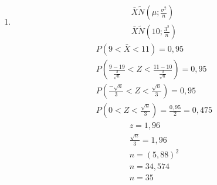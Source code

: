 \begin{description}
\begin{enumerate}[label=(\alph*)]
$n=25$
    \begin{align*}
      \mathbf{X} = \left(X_1, X_2, \ldots, $X_{25}\right) \\
      \bar{X} \tilde N(\mu; \frac{\sigma^2}{n})\\
      \bar{X} \tilde N(10; \frac{3^2}{25})
    \end{align*}
    \begin{align*}
      P(a< \bar{X}<11) = P \left(\frac{9-10}{\frac{3}{\sqrt{25}}} < Z < \frac{11-10}{\frac{3}{\sqrt{25}}}\right) \\
      P(- \frac{5}{3} < Z < \frac{5}{3}) = P \left(-1,67 < Z < 1,67\right) \\
=2 P( 0< Z <1,67 ) \\
=2 \times 0,45254 = 0,9105
    \end{align*}
  \item 
    \begin{align*}
      \bar{X} \tilde N(\mu; \frac{\sigma^2}{n})\\
      \bar{X} \tilde N(10; \frac{3^2}{n})
    \end{align*}
\begin{align*}
  P \left(9 < \bar{X} <11\right) = 0,95 \\
  P \left( \frac{9-19}{\frac{3}{\sqrt{n}}} < Z < \frac{11-10}{\frac{3}{\sqrt{n}}}\right)= 0,95 \\
P \left(\frac{- \sqrt{n}}{3} < Z < \frac{\sqrt{n}}{3} \right)= 0,95\\
P \left(0< Z < \frac{\sqrt{n}}{3}\right)= \frac{0,95}{2}=0,475
\end{align*}
\begin{align*}
 z= 1,96 \\
 \frac{\sqrt{n}}{3}=1,96 \\
 n= \left(5,88\right)^2 \\
 n= 34,574 \\
 n=35
\end{align*}
\end{enumerate}
\end{description}
